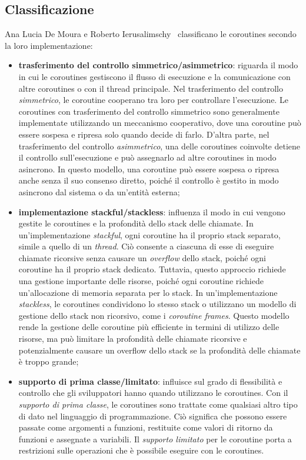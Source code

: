 \documentclass[12pt,a4paper,openright,twoside]{book}
\begin{document}
\subsection{Classificazione}
Ana Lucia De Moura e Roberto Ierusalimschy~\cite{DBLP:journals/toplas/MouraI09} classificano le coroutines secondo la loro implementazione: 
\begin{itemize}
    \item \textbf{trasferimento del controllo simmetrico/asimmetrico}: riguarda il modo in cui le coroutines gestiscono il flusso di esecuzione e la comunicazione con altre coroutines o con il thread principale.
    Nel trasferimento del controllo \textit{simmetrico}, le coroutine cooperano tra loro per controllare l'esecuzione. Le coroutines con trasferimento del controllo simmetrico sono generalmente implementate utilizzando un meccanismo cooperativo, dove una coroutine può essere sospesa e ripresa solo quando decide di farlo.
    D'altra parte, nel trasferimento del controllo \textit{asimmetrico}, una delle coroutines coinvolte detiene il controllo sull'esecuzione e può assegnarlo ad altre coroutines in modo asincrono. In questo modello, una coroutine può essere sospesa o ripresa anche senza il suo consenso diretto, poiché il controllo è gestito in modo asincrono dal sistema o da un'entità esterna;
    \item \textbf{implementazione stackful/stackless}: influenza il modo in cui vengono gestite le coroutines e la profondità dello stack delle chiamate.
    In un'implementazione \textit{stackful}, ogni coroutine ha il proprio stack separato, simile a quello di un \textit{thread}. Ciò consente a ciascuna di esse di eseguire chiamate ricorsive senza causare un \textit{overflow} dello stack, poiché ogni coroutine ha il proprio stack dedicato. Tuttavia, questo approccio richiede una gestione importante delle risorse, poiché ogni coroutine richiede un'allocazione di memoria separata per lo stack.
    In un'implementazione \textit{stackless}, le coroutines condividono lo stesso stack o utilizzano un modello di gestione dello stack non ricorsivo, come i \textit{coroutine frames}. Questo modello rende la gestione delle coroutine più efficiente in termini di utilizzo delle risorse, ma può limitare la profondità delle chiamate ricorsive e potenzialmente causare un overflow dello stack se la profondità delle chiamate è troppo grande; 
    \item \textbf{supporto di prima classe/limitato}: influisce sul grado di flessibilità e controllo che gli sviluppatori hanno quando utilizzano le coroutines.
    Con il \textit{supporto di prima classe}, le coroutines sono trattate come qualsiasi altro tipo di dato nel linguaggio di programmazione. Ciò significa che possono essere passate come argomenti a funzioni, restituite come valori di ritorno da funzioni e assegnate a variabili.
    Il \textit{supporto limitato} per le coroutine porta a restrizioni sulle operazioni che è possibile eseguire con le coroutines.
\end{itemize}
\end{document}
